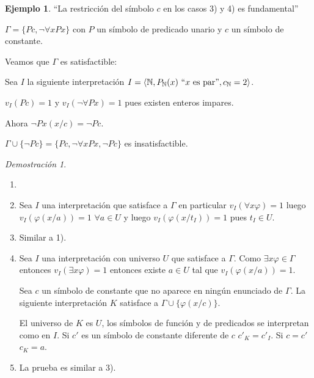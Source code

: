 \documentclass[a4paper,11pt]{article}
\theoremstyle{definition}
\newtheorem{exap}{Ejemplo}[section]
\theoremstyle{remark}
\newtheorem*{demo}{Demostración}
\def\NN{\mathbb{N}}
\begin{document}
\begin{exap}
    ``La restricción del símbolo $c$ en los casos 3) y 4) es
    fundamental''
    
    $\Gamma = \{ P c, \lnot \forall x Px \}$ con $P$ un símbolo de
    predicado unario y $c$ un símbolo de constante.
    
    Veamos que $\Gamma$ es satisfactible:
    
    Sea $I$  la siguiente interpretación $I = \langle \NN, 
    P_{\NN}(x)\ ``x\text{ es par''}, c_{\NN} = 2 \rangle$.
    
    $v_I(P c) = 1$ y $v_I(\lnot \forall P x) = 1$ pues existen 
    enteros impares.
    
    Ahora $\lnot P x (x/c) = \lnot P c$.
    
    $\Gamma \cup \{ \lnot P c\} = \{ P c, \lnot \forall x P x, \lnot P c\}$
    es insatisfactible.
\end{exap}

\begin{demo}
    \begin{enumerate}
        \item []
        
        \item Sea $I$ una interpretación que satisface a $\Gamma$
        en particular $v_I(\forall x \varphi) = 1$ luego
        $v_I(\varphi(x/a)) = 1$ $\forall a \in U$ y 
        luego $v_I(\varphi(x/t_I)) = 1$ pues $t_I \in U$.
        
        \item Similar a 1).
        
        \item Sea $I$ una interpretación con universo $U$
        que satisface a $\Gamma$. Como $\exists x \varphi \in \Gamma$
        entonces $v_I(\exists x \varphi) = 1$ entonces 
        existe $a \in U$ tal que $v_I(\varphi(x/a)) = 1$.
        
        Sea $c$ un símbolo de constante que no aparece en
        ningún enunciado de $\Gamma$. La siguiente interpretación
        $K$ satisface a $\Gamma \cup \{ \varphi(x/c) \}$.
        
        El universo de $K$ es $U$, los símbolos de función y
        de predicados se interpretan como en $I$. Si $c'$ es
        un símbolo de constante diferente de $c$ $c'_K = c'_I$.
        Si $c = c'$ $c_K = a$.
        
        \item La prueba es similar a 3).
    \end{enumerate}
\end{demo}
\end{document}
